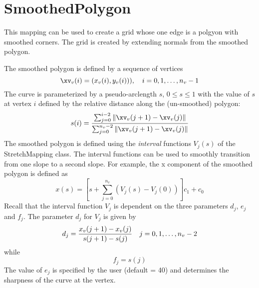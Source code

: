 \section{SmoothedPolygon}

This mapping can be used to create a grid whose one edge is
a polgyon with smoothed corners. The grid is created by extending
normals from the smoothed polygon.

% 
% 

The smoothed polygon is defined by a sequence of vertices 
$$
     \xv_v(i) = (x_v(i),y_v(i))), ~~~i=0,1,\ldots,n_v-1
$$      
The curve is parameterized by a pseudo-arclength $s$, $0\le s \le 1$
with the value of $s$ at vertex $i$ defined by the relative distance
along the (un-smoothed) polygon:
$$
     s(i)= { \sum_{j=0}^{i-2} \| \xv_v(j+1)-\xv_v(j) \| \over
             \sum_{j=0}^{n_v-2} \| \xv_v(j+1)-\xv_v(j) \| }
$$
The smoothed polygon is defined using the {\it interval} functions
$V_j(s)$ of the StretchMapping class. The interval functions can be used to 
smoothly transition from one slope to a second slope.
For example, the x component of the smoothed polygon is defined as
$$
    x(s) = \left[ s+\sum_{j=0}^{n_v}( V_j(s)-V_j(0) )\right]c_1 + c_0
$$
Recall that the interval function $V_j$ is dependent on the three
parameters $d_j$, $e_j$ and $f_j$.
The parameter $d_j$ for $V_j$ is given by
$$
       d_j = { x_v(j+1)-x_v(j) \over s(j+1)-s(j)}  ~~~j=0,1,\ldots,n_v-2
$$
while
$$
       f_j=s(j)
$$
The value of $e_j$ is specified by the user (default = 40) and determines
the sharpness of the curve at the vertex. 

